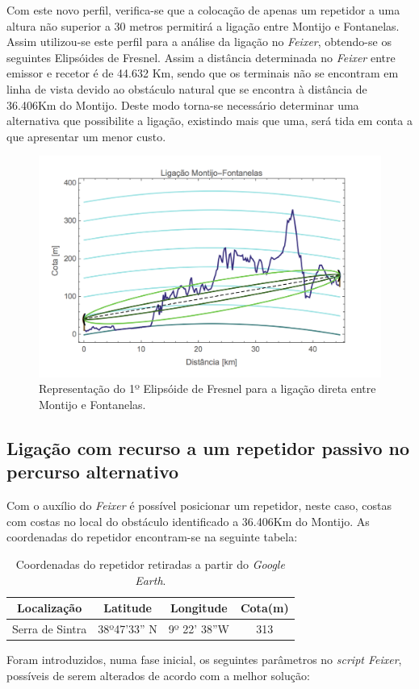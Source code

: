 Com este novo perfil, verifica-se que a colocação de apenas um repetidor a uma altura não superior a 30 metros permitirá a ligação entre Montijo e Fontanelas. Assim utilizou-se este perfil para a análise da ligação no \textit{Feixer}, obtendo-se os seguintes Elipsóides de Fresnel.
Assim a distância determinada no \textit{Feixer} entre emissor e recetor é de 44.632 Km, sendo que os terminais não se encontram em linha de vista devido ao obstáculo natural que se encontra à distância de 36.406Km do Montijo. Deste modo torna-se necessário determinar uma alternativa que possibilite a ligação, existindo mais que uma, será tida em conta a que apresentar um menor custo.
\begin{figure}[H]
\includegraphics[scale=0.5]{fresnel_dir.png}
\centering
\caption{Representação do 1º Elipsóide de Fresnel para a ligação direta entre Montijo e Fontanelas.}
\end{figure}

\subsection{Ligação com recurso a um repetidor passivo no percurso alternativo}

Com o auxílio do \textit{Feixer} é possível posicionar um repetidor, neste caso, costas com costas no local do obstáculo identificado a 36.406Km do Montijo. As coordenadas do repetidor encontram-se na seguinte tabela:
\begin{table}[H]
\centering
\begin{tabular}{|c|c|c|c|}
\hline
Localização & Latitude & Longitude & Cota(m)\\
\hline
Serra de Sintra & 38º47'33'' N & 9º 22' 38''W & 313\\
\hline
\end{tabular}
\caption{Coordenadas do repetidor retiradas a partir do \textit{Google Earth}.}
\label{coord_rep}
\end{table}
Foram introduzidos, numa fase inicial, os seguintes parâmetros no \textit{script Feixer}, possíveis de serem alterados de acordo com a melhor solução:

